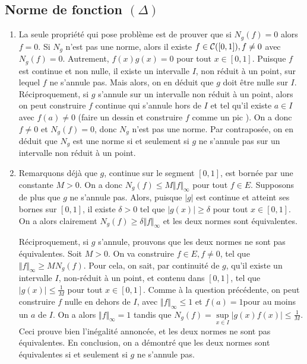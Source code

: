 \subsection{Norme de fonction \texorpdfstring{$(\Delta)$}{Delta}}

\begin{enumerate}
    \item La seule propriété qui pose problème est de prouver que si $N_g(f)=0$ alors $f=0$. Si $N_g$ n'est pas une norme, alors il existe $f\in\mathcal{C}([0,1]), f\neq 0$ avec $N_g(f)=0$. Autrement, $f(x)g(x) = 0$ pour tout $x\in[0,1]$. Puisque $f$ est continue et non nulle, il existe un intervalle $I$, non réduit à un point, sur lequel $f$ ne s'annule pas. Mais alors, on en déduit que $g$ doit être nulle sur $I$. Réciproquement, si $g$ s'annule sur un intervalle non réduit à un point, alors on peut construire $f$ continue qui s'annule hors de $I$ et tel qu'il existe $a \in I$ avec $f(a) \neq 0$ (faire un dessin et construire $f$ comme un \og pic \fg{} ). On a donc $f \neq 0$ et $N_g(f) = 0$, donc $N_g$ n'est pas une norme. Par contraposée, on en déduit que $N_g$ est une norme si et seulement si $g$ ne s'annule pas sur un intervalle non réduit à un point.
    
    \item Remarquons déjà que $g$, continue sur le segment $[0,1]$, est bornée par une constante $M > 0$. On a donc $N_g(f) \leqslant M \Vert f \Vert_\infty$ pour tout $f \in E$. Supposons de plus que $g$ ne s'annule pas. Alors, puisque $|g|$ est continue et atteint ses bornes sur $[0,1]$, il existe $\delta >0$ tel que $|g(x)| \geqslant \delta$ pour tout $x\in [0,1]$. On a alors clairement $N_g(f)\geqslant \delta \Vert f \Vert_\infty$ et les deux normes sont équivalentes.

Réciproquement, si $g$ s'annule, prouvons que les deux normes ne sont pas équivalentes. Soit $M > 0$. On va construire $f\in E, f\neq 0$, tel que $\Vert f \Vert_\infty \geqslant MN_g(f)$. Pour cela, on sait, par continuité de $g$, qu'il existe un intervalle $I$, non-réduit à un point, et contenu dans $[0,1]$, tel que $|g(x)|\leqslant \frac{1}{M}$ pour tout $x \in [0,1]$. Comme à la question précédente, on peut construire $f$ nulle en dehors de $I$, avec $\Vert f \Vert_\infty \leqslant 1$ et $f(a) = 1$pour au moins un $a$ de $I$. On a alors $\Vert f \Vert_\infty = 1$ tandis que $N_g(f) = \sup\limits_{x\in I} \vert g(x)f(x)\vert \leqslant \frac{1}{M}$. Ceci prouve bien l'inégalité annoncée, et les deux normes ne sont pas équivalentes. En conclusion, on a démontré que les deux normes sont équivalentes si et seulement si $g$ ne s'annule pas.
\end{enumerate}

